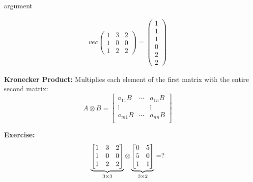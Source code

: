 \begin{labeling}{argument}
    \begin{sol}
        \begin{align*}
            vec \begin{pmatrix}
                    1 & 3 & 2 \\
                    1 & 0 & 0 \\
                    1 & 2 & 2
                \end{pmatrix}
            =
            \begin{pmatrix}
                1 \\ 1 \\ 1 \\ 0 \\ 2 \\ 2
            \end{pmatrix}
        \end{align*}
    \end{sol}

    \item[\textbf{Kronecker Product:}] Multiplies each element of the first matrix with the entire second matrix:
    \[
        A \otimes B = \begin{bmatrix}
            a_{11} B & \cdots & a_{1n} B \\
            \vdots   &        & \vdots   \\
            a_{m1} B & \cdots & a_{nn} B \\
        \end{bmatrix}
    \]

    \textbf{Exercise:}
    \[
        \underbrace{%
            \begin{bmatrix}
                1 & 3 & 2 \\
                1 & 0 & 0 \\
                1 & 2 & 2
            \end{bmatrix}%
        }_{3 \times 3}
        \otimes
        \underbrace{%
            \begin{bmatrix}
                0 & 5 \\
                5 & 0 \\
                1 & 1
            \end{bmatrix}%
        }_{3 \times 2}
        = ?
    \]


\end{labeling}
